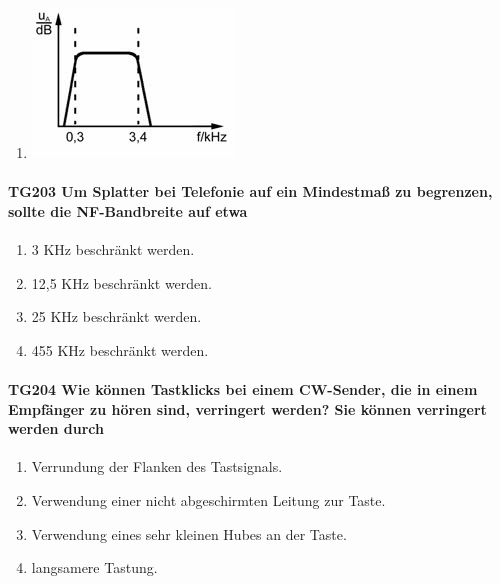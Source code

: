 \documentclass[8pt]{article}
\begin{document}
\begin{enumerate}[nolistsep,label=\Alph*]
\item
\begin{center}
	\begin{minipage}{\linewidth}
		\centering
		\includegraphics[scale=1.0]{pics/tg202_a.jpg}
	\end{minipage}
\end{center}
\end{enumerate}

\paragraph*{TG203 Um Splatter bei Telefonie auf ein Mindestmaß zu begrenzen, sollte die NF-Bandbreite auf etwa}
\begin{enumerate}[nolistsep,label=\Alph*]
\item 3 KHz beschränkt werden.
\item 12,5 KHz beschränkt werden.
\item 25 KHz beschränkt werden.
\item 455 KHz beschränkt werden.
\end{enumerate}

\paragraph*{TG204 Wie können Tastklicks bei einem CW-Sender, die in einem Empfänger zu hören sind, verringert werden? Sie können verringert werden durch}
\begin{enumerate}[nolistsep,label=\Alph*]
\item Verrundung der Flanken des Tastsignals.
\item Verwendung einer nicht abgeschirmten Leitung zur Taste.
\item Verwendung eines sehr kleinen Hubes an der Taste.
\item langsamere Tastung.
\end{enumerate}
\end{document}
